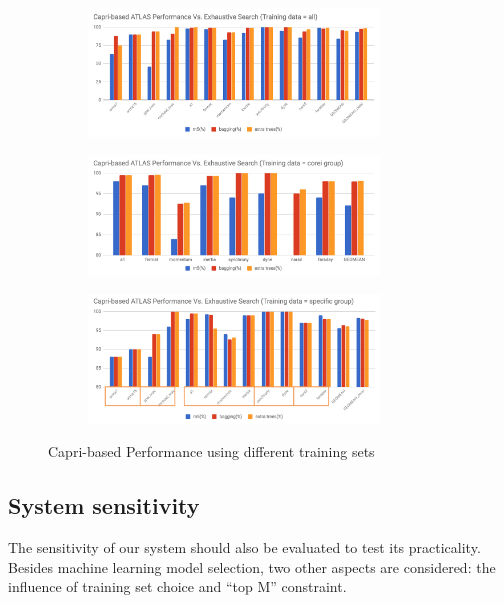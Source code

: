   \begin{figure}[tbhp]
    \centering
    \begin{subfigure}[b]{1.0\linewidth}
      \centering
      \includegraphics[width=0.85\textwidth]{images/all_perf.png}
      \caption{ }
      \label{fig:all_perf}
    \end{subfigure}
    \begin{subfigure}[b]{1.0\linewidth}
      \centering
      \includegraphics[width=0.85\textwidth]{images/corei_perf.png}
      \caption{ }
      \label{fig:corei_perf}
    \end{subfigure}
    \begin{subfigure}[b]{1.0\linewidth}
      \centering
      \includegraphics[width=0.85\textwidth]{images/specific_perf.png}
      \caption{ }
      \label{fig:specific_perf}
    \end{subfigure}
  \caption{Capri-based \atl Performance using different training sets}
  \end{figure}

  \subsection{System sensitivity}
  \label{sec:system_sensitivity}
    The sensitivity of our system should also be evaluated to test its
    practicality. Besides machine learning model selection, two other aspects
    are considered: the influence of training set choice and ``top M''
    constraint.

